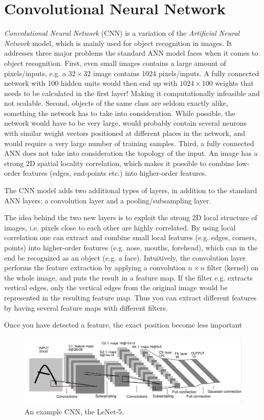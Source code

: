 \section{Convolutional Neural Network}

\textit{Convolutional Neural Network}\cite{LeCun1998} (CNN) is a variation of the \textit{Artificial Neural Network} model, which is mainly used for object recognition in images. It addresses three major problems the standard ANN model faces when it comes to object recognition. First, even small images contains a large amount of pixels/inputs, e.g. a $ 32 \times 32 $ image contains 1024 pixels/inputs. A fully connected network with 100 hidden units would then end up with $ 1024 \times 100 $ weights that needs to be calculated in the first layer! Making it computationally infeasible and not scalable. Second, objects of the same class are seldom exactly alike, something the network has to take into consideration. While possible, the network would have to be very large, would probably contain several neurons with similar weight vectors positioned at different places in the network, and would require a very large number of training samples. Third, a fully connected ANN does not take into consideration the topology of the input. An image has a strong 2D spatial locality correlation, which makes it possible to combine low-order features (edges, end-points etc.) into higher-order features.  

The CNN model adds two additional types of layers, in addition to the standard ANN layers: a convolution layer and a pooling/subsampling layer.

The idea behind the two new layers is to exploit the strong 2D local structure of images, i.e. pixels close to each other are highly correlated. By using local correlation one can extract and combine small local features (e.g. edges, corners, points) into higher-order features (e.g. nose, mouths, forehead), which can in the end be recognized as an object (e.g. a face). Intuitively, the convolution layer performs the feature extraction by applying a convolution $ n \times n $ filter (kernel) on the whole image, and puts the result in a feature map. If the filter e.g. extracts vertical edges, only the vertical edges from the original image would be represented in the resulting feature map. Thus you can extract different features by having several feature maps with different filters.  

Once you have detected a feature, the exact position become less important

\begin{figure}[h!]
  \centering
      \includegraphics[width=1.0\textwidth]{Figures/Background/convnet}
  \caption{An example CNN, the LeNet-5\cite{LeCun1998}. }
\end{figure}





